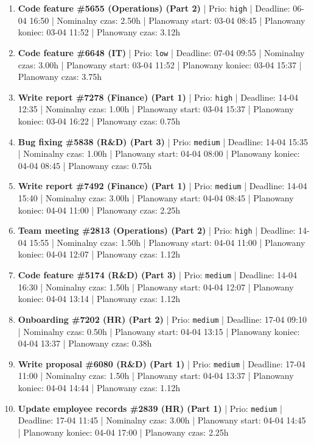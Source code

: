 {\begin{enumerate}
  \item [\textbf{14626}] \textbf{Code feature \#5655 (Operations) (Part 2)} | Prio: \texttt{high} | Deadline: 06-04 16:50 | Nominalny czas: 2.50h | Planowany start: 03-04 08:45 | Planowany koniec: 03-04 11:52 | Planowany czas: 3.12h
  \item [\textbf{14683}] \textbf{Code feature \#6648 (IT)} | Prio: \texttt{low} | Deadline: 07-04 09:55 | Nominalny czas: 3.00h | Planowany start: 03-04 11:52 | Planowany koniec: 03-04 15:37 | Planowany czas: 3.75h
  \item [\textbf{14609}] \textbf{Write report \#7278 (Finance) (Part 1)} | Prio: \texttt{high} | Deadline: 14-04 12:35 | Nominalny czas: 1.00h | Planowany start: 03-04 15:37 | Planowany koniec: 03-04 16:22 | Planowany czas: 0.75h
  \item [\textbf{14637}] \textbf{Bug fixing \#5838 (R\&D) (Part 3)} | Prio: \texttt{medium} | Deadline: 14-04 15:35 | Nominalny czas: 1.00h | Planowany start: 04-04 08:00 | Planowany koniec: 04-04 08:45 | Planowany czas: 0.75h
  \item [\textbf{14642}] \textbf{Write report \#7492 (Finance) (Part 1)} | Prio: \texttt{medium} | Deadline: 14-04 15:40 | Nominalny czas: 3.00h | Planowany start: 04-04 08:45 | Planowany koniec: 04-04 11:00 | Planowany czas: 2.25h
  \item [\textbf{14617}] \textbf{Team meeting \#2813 (Operations) (Part 2)} | Prio: \texttt{high} | Deadline: 14-04 15:55 | Nominalny czas: 1.50h | Planowany start: 04-04 11:00 | Planowany koniec: 04-04 12:07 | Planowany czas: 1.12h
  \item [\textbf{14646}] \textbf{Code feature \#5174 (R\&D) (Part 3)} | Prio: \texttt{medium} | Deadline: 14-04 16:30 | Nominalny czas: 1.50h | Planowany start: 04-04 12:07 | Planowany koniec: 04-04 13:14 | Planowany czas: 1.12h
  \item [\textbf{14648}] \textbf{Onboarding \#7202 (HR) (Part 2)} | Prio: \texttt{medium} | Deadline: 17-04 09:10 | Nominalny czas: 0.50h | Planowany start: 04-04 13:15 | Planowany koniec: 04-04 13:37 | Planowany czas: 0.38h
  \item [\textbf{14669}] \textbf{Write proposal \#6080 (R\&D) (Part 1)} | Prio: \texttt{medium} | Deadline: 17-04 11:00 | Nominalny czas: 1.50h | Planowany start: 04-04 13:37 | Planowany koniec: 04-04 14:44 | Planowany czas: 1.12h
  \item [\textbf{14670}] \textbf{Update employee records \#2839 (HR) (Part 1)} | Prio: \texttt{medium} | Deadline: 17-04 11:45 | Nominalny czas: 3.00h | Planowany start: 04-04 14:45 | Planowany koniec: 04-04 17:00 | Planowany czas: 2.25h

\end{enumerate}}
